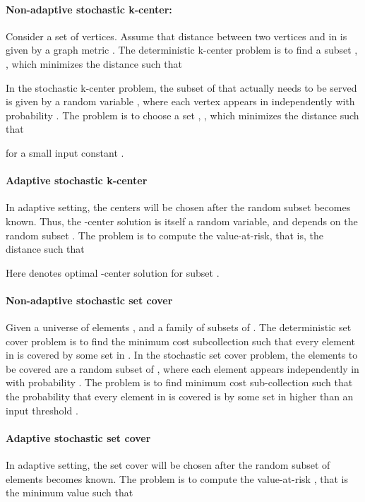 \documentclass[11pt,onecolumn]{article}
\begin{document}
\paragraph{Non-adaptive stochastic k-center:} Consider a set  of  vertices. 
Assume that distance  between two vertices  and  in  is given by a
graph metric . The deterministic k-center problem is to find a subset , , which minimizes the distance  such that 
 
In the stochastic k-center problem, the subset of  that actually needs to be served is given by a random variable , where each vertex  appears in  independently with probability . 
The problem is to choose a set , , which minimizes the distance  such that 
 
for a small input constant .

\paragraph{Adaptive stochastic k-center}
In adaptive setting, the  centers will be chosen after the random subset  becomes known. Thus, the -center solution  is itself a random variable, and depends on the random subset . The problem is to compute the value-at-risk, that is, the distance  such that  

Here  denotes optimal -center solution for subset .

\paragraph{Non-adaptive stochastic set cover}
Given a universe of  elements , and a family  of  subsets of .
The deterministic set cover problem is to find the minimum cost subcollection  such that every element in  is covered by some set in . In the stochastic set cover problem, the elements to be covered are a random subset  of , where each element  appears independently in  with probability . 
The problem is to find minimum cost sub-collection  such that the probability that every element in  is covered is by some set in  higher than an input threshold .

\paragraph{Adaptive stochastic set cover}
In adaptive setting, the set cover will be chosen after the random subset of elements  becomes known. 
The problem is to compute the value-at-risk , that is the minimum value  such that 
\end{document}
